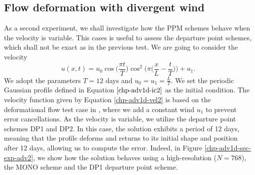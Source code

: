 \subsection{Flow deformation with divergent wind}
\label{chp-adv1d-sec-numerical-exp-2}
As a second experiment, we shall investigate how the PPM schemes behave when the velocity
is variable.
This cases is useful to assess the departure point schemes, which shall not be exact as in the previous test.
We are going to consider the velocity
\begin{equation}
	\label{chp-adv1d-vel2}
	u(x,t) = u_0\cos{\bigg(\frac{\pi t}{T}\bigg)}\cos^2\bigg(\pi \bigg(\frac{x}{L}-\frac{t}{T}\bigg)\bigg) + u_1.
\end{equation}
We adopt the parameters $T = 12$ days and  $u_0 = u_1 = \frac{L}{T}$.
We set the periodic Gaussian profile defined in Equation $\eqref{chp-adv1d-ic2}$ as the initial condition.
The velocity function given by Equation \eqref{chp-adv1d-vel2} is based
on the deformational flow test case in \citet{nair:2010},
where we add a constant wind $u_1$ to prevent error cancellations.
As the velocity is variable, we utilize the departure point schemes DP1 and DP2.
In this case, the solution exhibits a period of 12 days,
meaning that the profile deforms and returns to its initial shape
and position after 12 days, allowing us to compute the error.
Indeed, in Figure \ref{chp-adv1d-sec-exp-adv2}, we show how the solution behaves
using a high-resolution ($N=768$), the MONO scheme and the DP1 departure point scheme.
